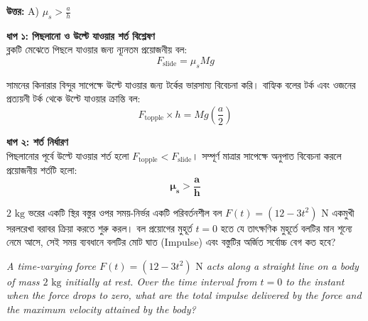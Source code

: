 \documentclass[12pt, a4paper]{article}
\begin{document}
\vspace{0.5em}
\begin{tcolorbox}[answerbox]
    \textbf{\color{success} উত্তর:} A) $\mu_s > \frac{a}{h}$
\end{tcolorbox}
\vspace{1em}

\begin{tcolorbox}[solutionbox={সমাধান (Solution)}]
    \noindent
    \textbf{ধাপ ১: পিছলানো ও উল্টে যাওয়ার শর্ত বিশ্লেষণ} \\
    ব্লকটি মেঝেতে পিছলে যাওয়ার জন্য ন্যূনতম প্রয়োজনীয় বল:
    \[ F_{\text{slide}} = \mu_s M g \]
    
    সামনের কিনারার বিন্দুর সাপেক্ষে উল্টে যাওয়ার জন্য টর্কের ভারসাম্য বিবেচনা করি। বাহ্যিক বলের টর্ক এবং ওজনের প্রত্যয়নী টর্ক থেকে উল্টে যাওয়ার ক্রান্তি বল:
    \[ F_{\text{topple}} \times h = M g \left(\frac{a}{2}\right) \]
    
    \vspace{0.5em}
    \noindent\textbf{ধাপ ২: শর্ত নির্ধারণ} \\
    পিছলানোর পূর্বে উল্টে যাওয়ার শর্ত হলো $F_{\text{topple}} < F_{\text{slide}}$। সম্পূর্ণ মাত্রার সাপেক্ষে অনুপাত বিবেচনা করলে প্রয়োজনীয় শর্তটি হলো:
    \[ \mathbf{\mu_s > \frac{a}{h}} \]
\end{tcolorbox}

\newpage

\begin{tcolorbox}[questionbox={প্রশ্ন (Question) 50}]
    \noindent
    $2\text{ kg}$ ভরের একটি স্থির বস্তুর ওপর সময়-নির্ভর একটি পরিবর্তনশীল বল $F(t) = (12 - 3t^2)\text{ N}$ একমুখী সরলরেখা বরাবর ক্রিয়া করতে শুরু করল। বল প্রয়োগের মুহূর্ত $t = 0$ হতে যে তাৎক্ষণিক মুহূর্তে বলটির মান শূন্যে নেমে আসে, সেই সময় ব্যবধানে বলটির মোট ঘাত (Impulse) এবং বস্তুটির অর্জিত সর্বোচ্চ বেগ কত হবে?
    
    \vspace{0.8em}
    \begin{english}
    \noindent\textit{\color{darkgray}
    A time-varying force $F(t) = (12 - 3t^2)\text{ N}$ acts along a straight line on a body of mass $2\text{ kg}$ initially at rest. Over the time interval from $t = 0$ to the instant when the force drops to zero, what are the total impulse delivered by the force and the maximum velocity attained by the body?
    }
    \end{english}
\end{tcolorbox}
\end{document}
